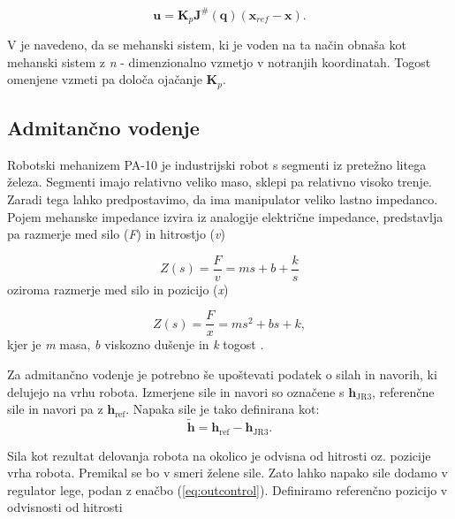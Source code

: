 \documentclass[a4paper]{article}
\begin{document}
\begin{equation} \label{eq:outcontrol}
\textbf{u} = \textbf{K}_p  \textbf{J}^{\#}(\textbf{q})  (\textbf{x}_{ref} - \textbf{x}).
\end{equation}

V \cite{mihelj_vodenje} je navedeno, da se mehanski sistem, ki je voden na ta način obnaša kot mehanski sistem z \textit{n} - dimenzionalno vzmetjo v notranjih koordinatah. Togost omenjene vzmeti pa določa ojačanje $\textbf{K}_p$.


\subsection{Admitančno vodenje} \label{sec:vodenje-admitance}

Robotski mehanizem PA-10 je industrijski robot s segmenti iz pretežno litega železa. Segmenti imajo relativno veliko maso, sklepi pa relativno visoko trenje. Zaradi tega lahko predpostavimo, da ima manipulator veliko lastno impedanco. Pojem mehanske impedance izvira iz analogije električne impedance, predstavlja pa razmerje med silo (\textit{F}) in hitrostjo (\textit{v}) 

\begin{equation}
Z(s) = \frac{F}{v} = ms + b + \frac{k}{s}
\end{equation}
oziroma razmerje med silo in pozicijo (\textit{x})

\begin{equation}
Z(s) = \frac{F}{x} = ms^2 + bs + k,
\end{equation}
kjer je \textit{m} masa, \textit{b} viskozno dušenje in \textit{k} togost \cite{mihelj_hapt}.



Za admitančno vodenje je potrebno še upoštevati podatek o silah in navorih, ki delujejo na vrhu robota. Izmerjene sile in navori so označene s $\textbf{h}_{\mathrm{JR3}}$, referenčne sile in navori pa z $\textbf{h}_{\mathrm{ref}}$. Napaka sile je tako definirana kot:
\begin{equation} \label{eq:herr}
\tilde{\textbf{h}} = \textbf{h}_{\mathrm{ref}} - \textbf{h}_{\mathrm{JR3}}.
\end{equation}

Sila kot rezultat delovanja robota na okolico je odvisna od hitrosti oz. pozicije vrha robota. Premikal se bo v smeri želene sile. Zato lahko napako sile dodamo v regulator lege, podan z enačbo (\ref{eq:outcontrol}). Definiramo referenčno pozicijo v odvisnosti od hitrosti
\end{document}
